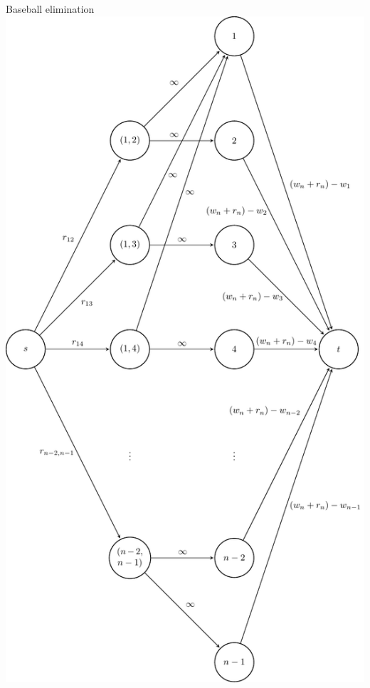 \documentclass{beamer}
\begin{document}
\begin{frame}{Baseball elimination}
    \centering\pause
    \includegraphics[scale=0.3]{../writing/images/baseball1.pdf}
\end{frame}


\bgroup
{}
\begin{frame}[plain]{}
\end{frame}
\egroup
\end{document}
